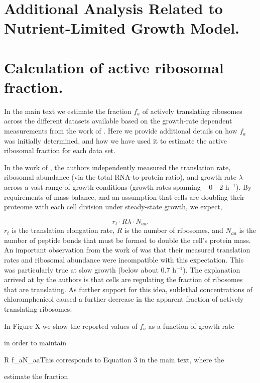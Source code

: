 \section{Additional Analysis Related to Nutrient-Limited Growth Model.}

\section{Calculation of active ribosomal fraction.}

In the main text we estimate the fraction $f_a$ of actively translating ribosomes across
the different datasets available based on the growth-rate dependent measurements from the work
of \citep{dai2016}. Here we provide additional details on how $f_a$ was initially determined,
and how we have used it to estimate the active ribosomal fraction for each data set.

In the work of \citep{dai2016}, the authors independently measured the
translation rate, ribosomal abundance (via the total RNA-to-protein ratio), and
growth rate $\lambda$ across a vast range of growth conditions (growth rates spanning ~ 0
- 2 h$^{-1}$). By requirements of mass balance, and an assumption that cells are doubling their
proteome with each cell division under steady-state growth, we expect,

\begin{equation}
  r_t \cdot R  \lambda \cdot N_{aa}.
\end{equation}
$r_t$ is the translation elongation rate, $R$ is the number of ribosomes, and $N_{aa}$ is the number of peptide bonds that must be formed to double the cell's protein mass. An important observation from the work of \citep{dai2016} was that their measured translation rates and ribosomal abundance were incompatible with this expectation. This was particularly true at slow growth (below about 0.7 h$^{-1}$). The explanation arrived at by the authors is that cells are regulating the fraction of ribosomes that are translating. As further support for this idea, sublethal concentrations of chloramphenicol caused a further decrease in the apparent
fraction of actively translating ribosomes.

In Figure X we show the reported values of $f_a$ as a function of growth rate

in order to maintain


 \cdot R \cdot f_a$ $N_{aa}This corresponds to Equation 3 in the main text, where the

estimate the fraction
